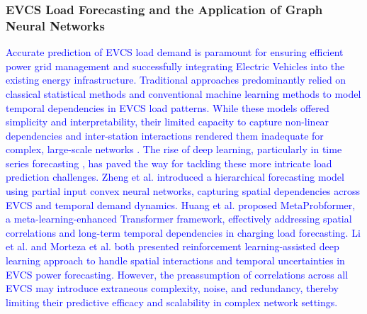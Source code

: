 \documentclass[lettersize,journal]{IEEEtran}
\newcommand{\hl}[1]{\textcolor{blue}{#1}}
\begin{document}
\subsubsection{EVCS Load Forecasting and the Application of Graph Neural Networks} 
\label{subsec:evcs_load}

\hl{Accurate prediction of EVCS load demand is paramount for ensuring efficient power grid management and successfully integrating Electric Vehicles into the existing energy infrastructure. Traditional approaches predominantly relied on classical statistical methods \cite{journal/ojvt2024/5rashid} and conventional machine learning methods \cite{journal/tte2024/10Wu} to model temporal dependencies in EVCS load patterns. 
While these models offered simplicity and interpretability, their limited capacity to capture non-linear dependencies and inter-station interactions rendered them inadequate for complex, large-scale networks \cite{journal/tia2023/zheng}.
The rise of deep learning, particularly in time series forecasting \cite{yaghoubi2024systematic, conference/aaai2021/11106Zhou, conference/iclr2023/zhang, conference/iclr2023/NieNSK23}, has paved the way for tackling these more intricate load prediction challenges. Zheng et al. \cite{journal/tia2023/zheng} introduced a hierarchical forecasting model using partial input convex neural networks, capturing spatial dependencies across EVCS and temporal demand dynamics. Huang et al. \cite{journal/tits2023/24huang} proposed MetaProbformer, a meta-learning-enhanced Transformer framework, effectively addressing spatial correlations and long-term temporal dependencies in charging load forecasting. Li et al. \cite{journal/tiv2023/8li} and Morteza et al. \cite{journal/tii2021/17Morteza} both presented reinforcement learning-assisted deep learning approach to handle spatial interactions and temporal uncertainties in EVCS power forecasting. 
However, the preassumption of correlations across all EVCS may introduce extraneous complexity, noise, and redundancy, thereby limiting their predictive efficacy and scalability in complex network settings.}
\end{document}
